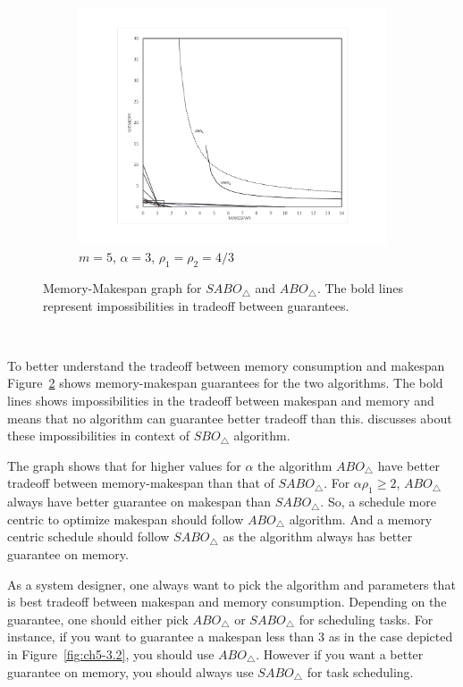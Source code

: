 \begin {figure}
      \begin{subfigure}[b]{0.5\textwidth}
        \includegraphics[width=\textwidth]{graph_M10_ALPHsq_3_rho_133.pdf}
        \caption{$m=5$, $\alpha=3$, $\rho_1=\rho_2=4/3$}
        \label{fig:ch5-3.3}
      \end{subfigure} %
    
      \caption{Memory-Makespan graph for $SABO_\triangle$ and $ABO_\triangle$. The bold lines represent impossibilities in tradeoff between guarantees.}
      \label{fig:ch5-3}
    \end{figure}\
    
 To better understand the tradeoff between memory consumption and makespan Figure~\ref{fig:ch5-3} shows memory-makespan guarantees for the two algorithms.  The bold lines shows impossibilities in the tradeoff between makespan and memory and means that no algorithm can guarantee better tradeoff than this. \cite{10.1109/IPDPS.2008.4536292} discusses about these impossibilities in context of $SBO_\triangle$ algorithm.

The graph shows that for higher values for $\alpha$ the  algorithm $ABO_\triangle$ have better tradeoff between memory-makespan than that of  $SABO_\triangle$. For $\alpha\rho_1\geq 2$,  $ABO_\triangle$ always have better guarantee on makespan than $SABO_\triangle$. So, a schedule more centric to optimize makespan should follow $ABO_\triangle$ algorithm. And a memory centric schedule should follow $SABO_\triangle$ as the algorithm always has better guarantee on memory. 

As a system designer, one always want to pick the algorithm and parameters that is best tradeoff between makespan and memory consumption.  Depending on the guarantee, one should either pick $ABO_\triangle$ or  $SABO_\triangle$  for scheduling tasks.  For instance, if you want to guarantee a makespan  less than 3 as in the case depicted in Figure~\ref{fig:ch5-3.2}, you should use  $ABO_\triangle$. However if you  want a better guarantee on memory, you should always use  $SABO_\triangle$ for task scheduling.
  
              
               
               
        